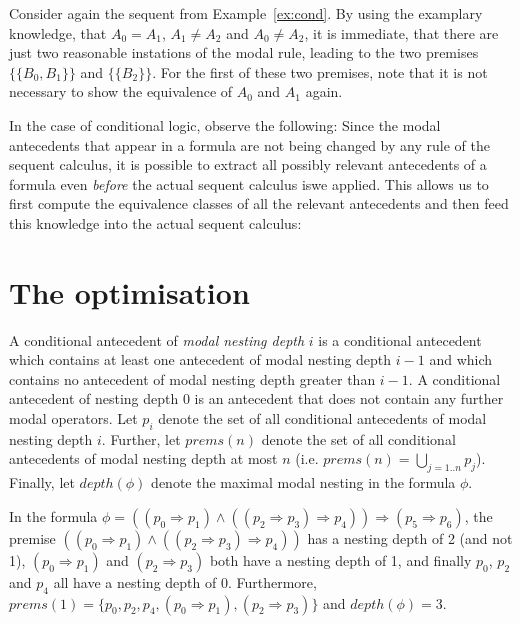 \documentclass{entcs} \usepackage{entcsmacro}
\begin{document}
\begin{example}
Consider again the sequent from Example~\ref{ex:cond}. By using the examplary
knowledge, that $A_0=A_1$, $A_1\neq A_2$ and $A_0\neq A_2$, it is immediate,
that there are just two reasonable instations of the modal rule, leading
to the two premises $\{\{B_0,B_1\}\}$ and $\{\{B_2\}\}$. For the
first of these two premises, note that it is not necessary to show the
equivalence of $A_0$ and $A_1$ again.
\end{example}


\begin{remark}
In the case of conditional logic, observe the following: Since the
modal antecedents that appear in a formula are not being changed by any
rule of the sequent calculus, it is possible to extract all possibly
relevant antecedents of a formula even \emph{before} the actual sequent
calculus iswe applied. This allows us to first compute the equivalence
classes of all the relevant antecedents and then feed this knowledge into
the actual sequent calculus:
\end{remark}

\section{The optimisation}

\begin{definition}
A conditional antecedent of \emph{modal nesting depth} $i$ is a
conditional antecedent which contains at least one antecedent of
modal nesting depth $i-1$ and which contains no antecedent 
of modal nesting depth greater than $i-1$. A
conditional antecedent of nesting depth 0 is an antecedent
that does not contain any further modal operators.
Let $p_i$ denote the set of all conditional antecedents of modal
nesting depth $i$. Further, let $prems(n)$ denote the set of all
conditional antecedents of modal nesting depth at most $n$ (i.e.
$prems(n)=\bigcup_{j=1..n}^{} p_j$).
Finally, let $depth(\phi)$ denote the maximal modal nesting in
the formula $\phi$.
\end{definition}

\begin{example}
In the formula $\phi=((p_0\Rightarrow p_1) \wedge ((p_2\Rightarrow p_3)\Rightarrow p_4))
\Rightarrow (p_5\Rightarrow p_6)$,
the premise $((p_0\Rightarrow p_1) \wedge ((p_2\Rightarrow p_3)\Rightarrow p_4))$ has a
nesting depth of 2 (and not 1), $(p_0\Rightarrow p_1)$ and $(p_2\Rightarrow p_3)$ both
have a nesting depth of 1, and finally $p_0$, $p_2$ and $p_4$ all have a nesting depth of 0.
Furthermore, $prems(1)=\{p_0,p_2,p_4,(p_0\Rightarrow p_1),(p_2\Rightarrow p_3)\}$
and $depth(\phi)=3$.
\end{example}
\end{document}
